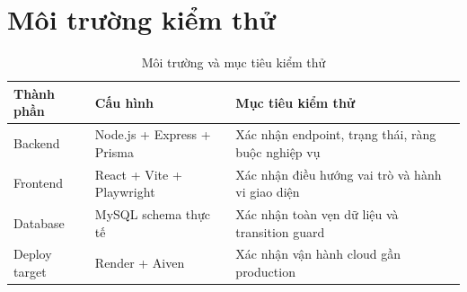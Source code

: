 \documentclass[12pt,a4paper]{report}
\begin{document}
\section{Môi trường kiểm thử}
\begin{table}[H]
\centering
\begin{tabular}{|L{3.0cm}|L{4.5cm}|L{5.2cm}|}
\hline
\textbf{Thành phần} & \textbf{Cấu hình} & \textbf{Mục tiêu kiểm thử} \\ \hline
Backend & Node.js + Express + Prisma & Xác nhận endpoint, trạng thái, ràng buộc nghiệp vụ \\ \hline
Frontend & React + Vite + Playwright & Xác nhận điều hướng vai trò và hành vi giao diện \\ \hline
Database & MySQL schema thực tế & Xác nhận toàn vẹn dữ liệu và transition guard \\ \hline
Deploy target & Render + Aiven & Xác nhận vận hành cloud gần production \\ \hline
\end{tabular}
\caption{Môi trường và mục tiêu kiểm thử}
\end{table}
\end{document}
